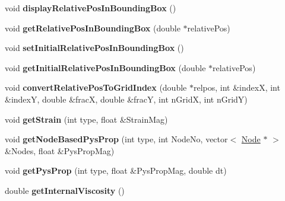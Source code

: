 \begin{DoxyCompactItemize}
\item 
\hypertarget{classShapeBase_ae5e17514271f121498ed12cebae3aebe}{}void {\bfseries display\+Relative\+Pos\+In\+Bounding\+Box} ()\label{classShapeBase_ae5e17514271f121498ed12cebae3aebe}

\item 
\hypertarget{classShapeBase_a0d33afa938cd84b1376806a06769f6b9}{}void {\bfseries get\+Relative\+Pos\+In\+Bounding\+Box} (double $\ast$relative\+Pos)\label{classShapeBase_a0d33afa938cd84b1376806a06769f6b9}

\item 
\hypertarget{classShapeBase_a8c7a7578407be503531bf14af6d004d1}{}void {\bfseries set\+Initial\+Relative\+Pos\+In\+Bounding\+Box} ()\label{classShapeBase_a8c7a7578407be503531bf14af6d004d1}

\item 
\hypertarget{classShapeBase_af2e6905d811de3ca73c0971b3fd21225}{}void {\bfseries get\+Initial\+Relative\+Pos\+In\+Bounding\+Box} (double $\ast$relative\+Pos)\label{classShapeBase_af2e6905d811de3ca73c0971b3fd21225}

\item 
\hypertarget{classShapeBase_ad34b6e8535ad7a534110f03792f5f5d1}{}void {\bfseries convert\+Relative\+Pos\+To\+Grid\+Index} (double $\ast$relpos, int \&index\+X, int \&index\+Y, double \&frac\+X, double \&frac\+Y, int n\+Grid\+X, int n\+Grid\+Y)\label{classShapeBase_ad34b6e8535ad7a534110f03792f5f5d1}

\item 
\hypertarget{classShapeBase_aecf99016ea7c36e0bff43a40e6a89df3}{}void {\bfseries get\+Strain} (int type, float \&Strain\+Mag)\label{classShapeBase_aecf99016ea7c36e0bff43a40e6a89df3}

\item 
\hypertarget{classShapeBase_ac1368b84a5ed722fa7b9f82656b49969}{}void {\bfseries get\+Node\+Based\+Pys\+Prop} (int type, int Node\+No, vector$<$ \hyperlink{classNode}{Node} $\ast$ $>$ \&Nodes, float \&Pys\+Prop\+Mag)\label{classShapeBase_ac1368b84a5ed722fa7b9f82656b49969}

\item 
\hypertarget{classShapeBase_abff91451c3465778ed89624d6196f7f6}{}void {\bfseries get\+Pys\+Prop} (int type, float \&Pys\+Prop\+Mag, double dt)\label{classShapeBase_abff91451c3465778ed89624d6196f7f6}

\item 
\hypertarget{classShapeBase_a51bc2c7303dfaae0687d1d785b077e81}{}double {\bfseries get\+Internal\+Viscosity} ()\label{classShapeBase_a51bc2c7303dfaae0687d1d785b077e81}


\end{DoxyCompactItemize}
